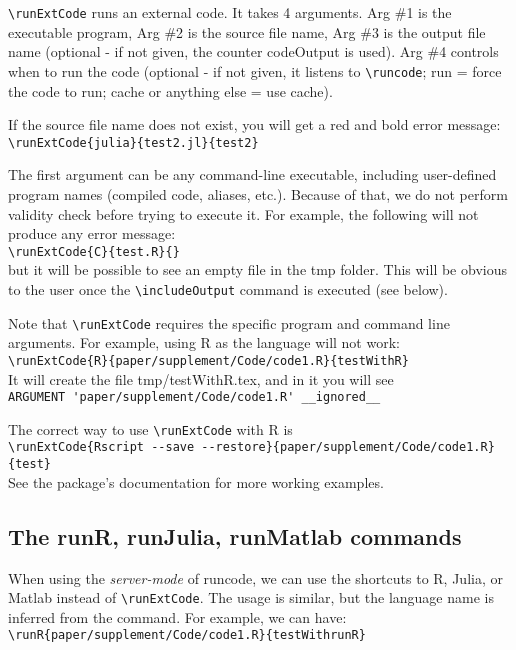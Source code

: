 \documentclass[a4paper,10pt]{article}
\begin{document}
\verb|\runExtCode| runs an external code. It takes 4 arguments.
Arg \#1 is the executable program,
Arg \#2 is the source file name,
Arg \#3 is the output file name (optional - if not given, the counter 
        codeOutput is used).
Arg \#4 controls when to run the code (optional - if not given, it listens
        to \verb|\runcode|; run = force the code to run; cache or anything else =
        use cache).

If the source file name does not exist, you will get a red and bold error message:\\
\verb|\runExtCode{julia}{test2.jl}{test2}|\\

The first argument can be any command-line executable, including user-defined program names (compiled code, aliases, etc.). Because of that, we do not perform validity check before trying to execute it.
For example, the following will not produce any error message:\\
\verb|\runExtCode{C}{test.R}{}|\\
but it will be possible to see an empty file in the tmp folder. This will be obvious to the user once the \verb|\includeOutput| command is executed (see below).

Note that \verb|\runExtCode| requires the specific program and command line arguments. For example, using R as the language will not work:\\
\verb|\runExtCode{R}{paper/supplement/Code/code1.R}{testWithR}|\\
It will create the file tmp/testWithR.tex, and in it you will see\\
\verb|ARGUMENT 'paper/supplement/Code/code1.R' __ignored__|

The correct way to use \verb|\runExtCode| with R is\\
\verb|\runExtCode{Rscript --save --restore}{paper/supplement/Code/code1.R}{test}|\\
See the package's documentation for more working examples.

\subsection*{The runR, runJulia, runMatlab commands}
When using the \textit{server-mode} of runcode, we can use the shortcuts to R, Julia, or Matlab instead of \verb|\runExtCode|. The usage is similar, but the language name is inferred from the command. For example, we can have:\\
\verb|\runR{paper/supplement/Code/code1.R}{testWithrunR}|
\\
\end{document}
